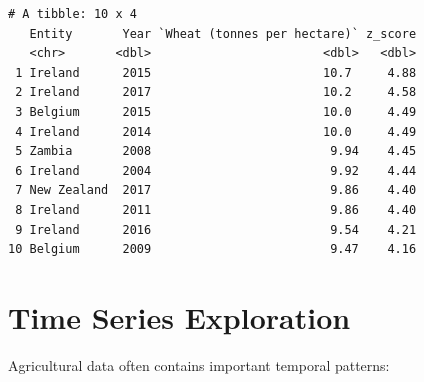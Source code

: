 \documentclass[
  letterpaper,
]{book}
\begin{document}
\begin{verbatim}
# A tibble: 10 x 4
   Entity       Year `Wheat (tonnes per hectare)` z_score
   <chr>       <dbl>                        <dbl>   <dbl>
 1 Ireland      2015                        10.7     4.88
 2 Ireland      2017                        10.2     4.58
 3 Belgium      2015                        10.0     4.49
 4 Ireland      2014                        10.0     4.49
 5 Zambia       2008                         9.94    4.45
 6 Ireland      2004                         9.92    4.44
 7 New Zealand  2017                         9.86    4.40
 8 Ireland      2011                         9.86    4.40
 9 Ireland      2016                         9.54    4.21
10 Belgium      2009                         9.47    4.16
\end{verbatim}

\section{Time Series Exploration}\label{time-series-exploration}

Agricultural data often contains important temporal patterns:
\end{document}
